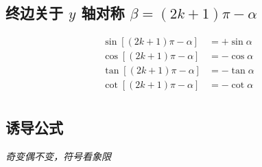 \documentclass[a4paper, fleqn, fontset = mac]{ctexart}
\newcommand{\diform}{\noindent}
\begin{document}
\begin{multicols}{2}
		\subsection{终边关于 $ y $ 轴对称 $\beta=(2k+1)\pi-\alpha$}\diform
			\begin{align*}
			\sin\left[\left(2k+1\right)\pi-\alpha\right]&=+\sin\alpha \\
			\cos\left[\left(2k+1\right)\pi-\alpha\right]&=-\cos\alpha \\
			\tan\left[\left(2k+1\right)\pi-\alpha\right]&=-\tan\alpha \\
			\cot\left[\left(2k+1\right)\pi-\alpha\right]&=-\cot\alpha \\
			\end{align*}
		\end{multicols}
		
		\subsection{诱导公式}
		\emph{奇变偶不变，符号看象限}
		
%			
\end{document}
